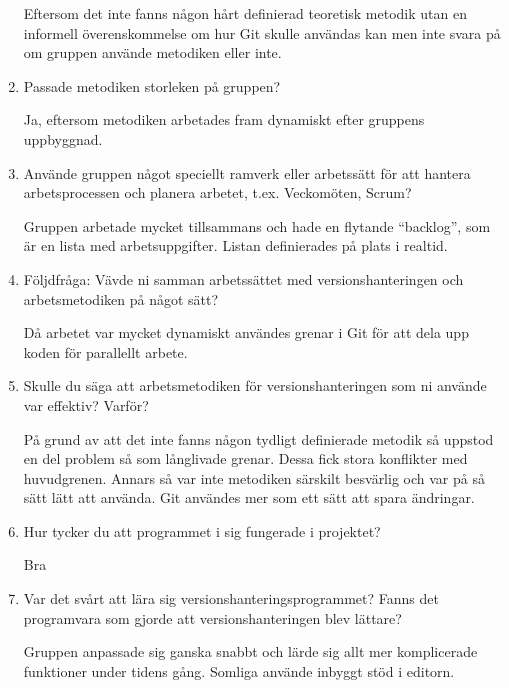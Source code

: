 \begin{enumerate}
    Eftersom det inte fanns någon hårt definierad teoretisk metodik utan en informell överenskommelse om hur Git skulle användas kan men inte svara på om gruppen använde metodiken eller inte.

    \item Passade metodiken storleken på gruppen?

    Ja, eftersom metodiken arbetades fram dynamiskt efter gruppens uppbyggnad.

    \item Använde gruppen något speciellt ramverk eller arbetssätt för att hantera arbetsprocessen och planera arbetet, t.ex. Veckomöten, Scrum?

    Gruppen arbetade mycket tillsammans och hade en flytande ``backlog'', som är en lista med arbetsuppgifter. Listan definierades på plats i realtid.

    \item Följdfråga: Vävde ni samman arbetssättet med versionshanteringen och arbetsmetodiken på något sätt?

    Då arbetet var mycket dynamiskt användes grenar i Git för att dela upp koden för parallellt arbete.

    \item Skulle du säga att arbetsmetodiken för versionshanteringen som ni använde var effektiv? Varför?

    På grund av att det inte fanns någon tydligt definierade metodik så uppstod en del problem så som långlivade grenar. Dessa fick stora konflikter med huvudgrenen. Annars så var inte metodiken särskilt besvärlig och var på så sätt lätt att använda. Git användes mer som ett sätt att spara ändringar.

    \item Hur tycker du att programmet i sig fungerade i projektet?

    Bra

    \item Var det svårt att lära sig versionshanteringsprogrammet? Fanns det programvara som gjorde att versionshanteringen blev lättare?

    Gruppen anpassade sig ganska snabbt och lärde sig allt mer komplicerade funktioner under tidens gång. Somliga använde inbyggt stöd i editorn.
\end{enumerate}






